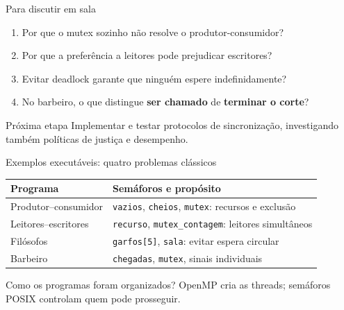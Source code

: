 \documentclass[aspectratio=169,11pt]{beamer}
\begin{document}
\begin{frame}{Para discutir em sala}
\begin{enumerate}
\setlength\itemsep{0.35cm}
\item Por que o mutex sozinho não resolve o produtor-consumidor?
\item Por que a preferência a leitores pode prejudicar escritores?
\item Evitar deadlock garante que ninguém espere indefinidamente?
\item No barbeiro, o que distingue \textbf{ser chamado} de \textbf{terminar o corte}?
\end{enumerate}
\vspace{0.2cm}
\begin{alertblock}{Próxima etapa}
Implementar e testar protocolos de sincronização, investigando também políticas de justiça e desempenho.
\end{alertblock}
\end{frame}


\begin{frame}{Exemplos executáveis: quatro problemas clássicos}
\small
\begin{tabular}{p{3.15cm}p{6.2cm}}
\toprule
\textbf{Programa} & \textbf{Semáforos e propósito}\\
\midrule
Produtor--consumidor & \texttt{vazios}, \texttt{cheios}, \texttt{mutex}: recursos e exclusão\\
Leitores--escritores & \texttt{recurso}, \texttt{mutex\_contagem}: leitores simultâneos\\
Filósofos & \texttt{garfos[5]}, \texttt{sala}: evitar espera circular\\
Barbeiro & \texttt{chegadas}, \texttt{mutex}, sinais individuais\\
\bottomrule
\end{tabular}
\vspace{0.3cm}
\begin{block}{Como os programas foram organizados?}
OpenMP cria as threads; semáforos POSIX controlam quem pode prosseguir.
\end{block}
\end{frame}
\end{document}
